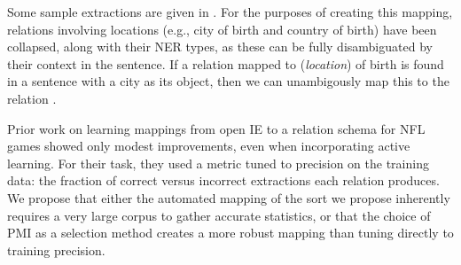 Some sample extractions are given in .
For the purposes of creating this mapping, relations involving
  locations (e.g., city of birth and country of birth) have been collapsed,
  along with their NER types, as these can be fully disambiguated by their
  context in the sentence.
If a relation mapped to (\textit{location}) of birth is found in a sentence
  with a city as its object, then we can unambigously map this to the relation
  .
  
Prior work on learning mappings from open IE to a relation schema for NFL
  games \cite{key:2010soderland-nfl} showed only modest improvements, even
  when incorporating active learning.
For their task, they used a metric tuned to precision on the training data:
  the fraction of correct versus incorrect extractions each relation produces.
We propose that either the automated mapping of the sort we propose inherently
  requires a very large corpus to gather accurate statistics, or that the
  choice of PMI as a selection method creates a more robust mapping than tuning
  directly to training precision.


